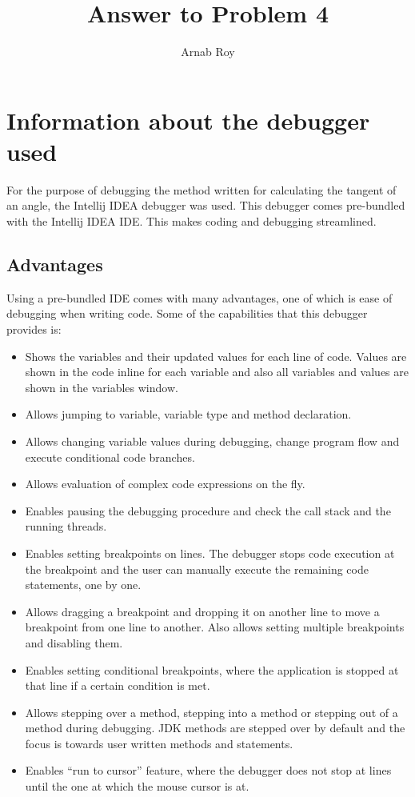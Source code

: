 \documentclass[12pt]{article}
\title{Answer to Problem 4}
\author{Arnab Roy }
\begin{document}
\maketitle

\section{Information about the debugger used}
For the purpose of debugging the method written for calculating the tangent of an angle, the Intellij IDEA debugger was used. This debugger comes pre-bundled with the Intellij IDEA IDE. This makes coding and debugging streamlined.
\subsection{Advantages}
Using a pre-bundled IDE comes with many advantages, one of which is ease of debugging when writing code. Some of the capabilities that this debugger provides is:
\begin{itemize}
    \item Shows the variables and their updated values for each line of code. Values are shown in the code inline for each variable and also all variables and values are shown in the variables window.
    \item Allows jumping to variable, variable type and method declaration.
    \item Allows changing variable values during debugging, change program flow and execute conditional code branches.
    \item Allows evaluation of complex code expressions on the fly.
    \item Enables pausing the debugging procedure and check the call stack and the running threads.
    \item Enables setting breakpoints on lines. The debugger stops code execution at the breakpoint and the user can manually execute the remaining code statements, one by one.
    \item Allows dragging a breakpoint and dropping it on another line to move a breakpoint from one line to another. Also allows setting multiple breakpoints and disabling them.
    \item Enables setting conditional breakpoints, where the application is stopped at that line if a certain condition is met.
    \item Allows stepping over a method, stepping into a method or stepping out of a method during debugging. JDK methods are stepped over by default and the focus is towards user written methods and statements.
    \item Enables “run to cursor” feature, where the debugger does not stop at lines until the one at which the mouse cursor is at.
\end{itemize}
\end{document}
